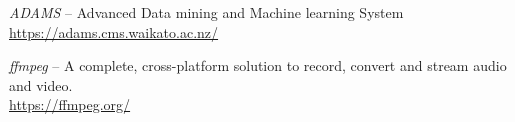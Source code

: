 
\begin{thebibliography}{999}

		\textit{ADAMS} -- Advanced Data mining and Machine learning System \\
		\url{https://adams.cms.waikato.ac.nz/}{}

		\textit{ffmpeg} -- A complete, cross-platform solution to record,
		convert and stream audio and video.  \\
		\url{https://ffmpeg.org/}{}

\end{thebibliography}
